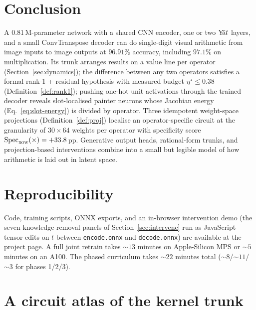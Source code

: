 \documentclass[11pt]{article}
\theoremstyle{papsty}
\newcommand{\yat}{$\textnormal{Y}\!\bar{\text{a}}t$}
\newcommand{\Spec}{\mathrm{Spec}}
\begin{document}
\section{Conclusion}

A 0.81\,M-parameter network with a shared CNN encoder, one or two
\yat{} layers, and a small ConvTranspose decoder can do single-digit
visual arithmetic from image inputs to image outputs at $96.91\%$
accuracy, including $97.1\%$ on multiplication.
Its trunk arranges results on a value line per operator
(Section~\ref{sec:dynamics}); the difference between any two operators
satisfies a formal rank-1 + residual hypothesis with measured budget
$\eta^\star \le 0.38$ (Definition~\ref{def:rank1}); pushing one-hot unit
activations through the trained decoder reveals slot-localised painter
neurons whose Jacobian energy (Eq.~\ref{eq:slot-energy}) is divided by
operator. Three idempotent weight-space projections
(Definition~\ref{def:proj}) localise an operator-specific circuit at
the granularity of $30 \times 64$ weights per operator with
specificity score $\Spec_{\textsc{row}}(\times) = +33.8$\,pp.
Generative output heads, rational-form trunks, and projection-based
interventions combine into a small but legible model of how arithmetic
is laid out in latent space.

\section*{Reproducibility}

Code, training scripts, ONNX exports, and an in-browser
intervention demo (the seven knowledge-removal panels of
Section~\ref{sec:intervene} run as JavaScript tensor edits on $t$ between
\texttt{encode.onnx} and \texttt{decode.onnx}) are available at the
project page. A full joint retrain takes $\sim 13$ minutes on
Apple-Silicon MPS or $\sim 5$ minutes on an A100. The phased curriculum
takes $\sim 22$ minutes total ($\sim 8$/$\sim 11$/$\sim 3$ for
phases 1/2/3).

\appendix

\section{A circuit atlas of the kernel trunk}
\label{app:circuit}
\end{document}
